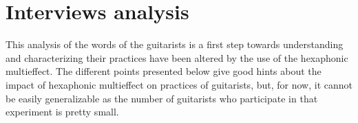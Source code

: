 \documentclass{article}
\begin{document}
    
    


\section{Interviews analysis}
\label{sec:analysis}

This analysis of the words of the guitarists is a first step towards understanding and characterizing their practices have been altered by the use of the hexaphonic multieffect.  
The different points presented below give good hints about the impact of hexaphonic multieffect on practices of guitarists, but, for now, it cannot be easily generalizable as the number of guitarists who participate in that experiment is pretty small.
\end{document}
